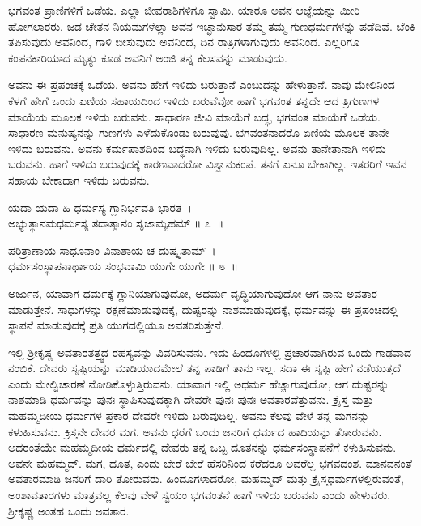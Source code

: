 ಭಗವಂತ ಪ್ರಾಣಿಗಳಿಗೆ ಒಡೆಯ. ಎಲ್ಲಾ ಜೀವರಾಶಿಗಳಿಗೂ ಸ್ವಾಮಿ. ಯಾರೂ ಅವನ ಆಜ್ಞೆಯನ್ನು ಮೀರಿ ಹೋಗಲಾರರು. ಜಡ ಚೇತನ ನಿಯಮಗಳೆಲ್ಲಾ ಅವನ ಇಚ್ಛಾನುಸಾರ ತಮ್ಮ ತಮ್ಮ ಗುಣಧರ್ಮಗಳನ್ನು ಪಡೆದಿವೆ. ಬೆಂಕಿ ತಪಿಸುವುದು ಅವನಿಂದ, ಗಾಳಿ ಬೀಸುವುದು ಅವನಿಂದ, ದಿನ ರಾತ್ರಿಗಳಾಗುವುದು ಅವನಿಂದ. ಎಲ್ಲರಿಗೂ ಕಂಪನಕಾರಿಯಾದ ಮೃತ್ಯು ಕೂಡ ಅವನಿಗೆ ಅಂಜಿ ತನ್ನ ಕೆಲಸವನ್ನು ಮಾಡುವುದು.

ಅವನು ಈ ಪ್ರಪಂಚಕ್ಕೆ ಒಡೆಯ. ಅವನು ಹೇಗೆ ಇಳಿದು ಬರುತ್ತಾನೆ ಎಂಬುದನ್ನು ಹೇಳುತ್ತಾನೆ. ನಾವು ಮೇಲಿನಿಂದ ಕೆಳಗೆ ಹೇಗೆ ಒಂದು ಏಣಿಯ ಸಹಾಯದಿಂದ ಇಳಿದು ಬರುವೆವೋ ಹಾಗೆ ಭಗವಂತ ತನ್ನದೇ ಆದ ತ್ರಿಗುಣಗಳ ಮಾಯೆಯ ಮೂಲಕ ಇಳಿದು ಬರುವನು. ಸಾಧಾರಣ ಜೀವಿ ಮಾಯೆಗೆ ಬದ್ಧ, ಭಗವಂತ ಮಾಯೆಗೆ ಒಡೆಯ. ಸಾಧಾರಣ ಮನುಷ್ಯನನ್ನು ಗುಣಗಳು ಎಳೆದುಕೊಂಡು ಬರುವುವು. ಭಗವಂತನಾದರೊ ಏಣಿಯ ಮೂಲಕ ತಾನೇ ಇಳಿದು ಬರುವನು. ಅವನು ಕರ್ಮಪಾಶದಿಂದ ಬದ್ಧನಾಗಿ ಇಳಿದು ಬರುವುದಿಲ್ಲ. ಅವನು ತಾನೇತಾನಾಗಿ ಇಳಿದು ಬರುವನು. ಹಾಗೆ ಇಳಿದು ಬರುವುದಕ್ಕೆ ಕಾರಣವಾದರೋ ವಿಶ್ವಾನುಕಂಪೆ. ತನಗೆ ಏನೂ ಬೇಕಾಗಿಲ್ಲ. ಇತರರಿಗೆ ಇವನ ಸಹಾಯ ಬೇಕಾದಾಗ ಇಳಿದು ಬರುವನು.

\begin{shloka}
ಯದಾ ಯದಾ ಹಿ ಧರ್ಮಸ್ಯ ಗ್ಲಾನಿರ್ಭವತಿ ಭಾರತ~।\\ಅಭ್ಯುತ್ಥಾನಮಧರ್ಮಸ್ಯ ತದಾತ್ಮಾನಂ ಸೃಜಾಮ್ಯಹಮ್ \hfill॥ ೭~॥
\end{shloka}

\begin{shloka}
ಪರಿತ್ರಾಣಾಯ ಸಾಧೂನಾಂ ವಿನಾಶಾಯ ಚ ದುಷ್ಕೃತಾಮ್~।\\ಧರ್ಮಸಂಸ್ಥಾಪನಾರ್ಥಾಯ ಸಂಭವಾಮಿ ಯುಗೇ ಯುಗೇ \hfill॥ ೮~॥
\end{shloka}

\begin{artha}
ಅರ್ಜುನ, ಯಾವಾಗ ಧರ್ಮಕ್ಕೆ ಗ್ಲಾನಿಯಾಗುವುದೋ, ಅಧರ್ಮ ವೃದ್ಧಿಯಾಗುವುದೋ ಆಗ ನಾನು ಅವತಾರ ಮಾಡುತ್ತೇನೆ. ಸಾಧುಗಳನ್ನು ರಕ್ಷಣೆಮಾಡುವುದಕ್ಕೆ, ದುಷ್ಟರನ್ನು ನಾಶಮಾಡುವುದಕ್ಕೆ, ಧರ್ಮವನ್ನು ಈ ಪ್ರಪಂಚದಲ್ಲಿ ಸ್ಥಾಪನೆ ಮಾಡುವುದಕ್ಕೆ ಪ್ರತಿ ಯುಗದಲ್ಲಿಯೂ ಅವತರಿಸುತ್ತೇನೆ.
\end{artha}

ಇಲ್ಲಿ ಶ‍್ರೀಕೃಷ್ಣ ಅವತಾರತತ್ತ್ವದ ರಹಸ್ಯವನ್ನು ವಿವರಿಸುವನು. ಇದು ಹಿಂದೂಗಳಲ್ಲಿ ಪ್ರಚಾರವಾಗಿರುವ ಒಂದು ಗಾಢವಾದ ನಂಬಿಕೆ. ದೇವರು ಸೃಷ್ಟಿಯನ್ನು ಮಾಡಿಯಾದಮೇಲೆ ತನ್ನ ಪಾಡಿಗೆ ತಾನು ಇಲ್ಲ. ಸದಾ ಈ ಸೃಷ್ಟಿ ಹೇಗೆ ನಡೆಯುತ್ತದೆ ಎಂದು ಮೇಲ್ವಿಚಾರಣೆ ನೋಡಿಕೊಳ್ಳುತ್ತಿರುವನು. ಯಾವಾಗ ಇಲ್ಲಿ ಅಧರ್ಮ ಹೆಚ್ಚಾಗುವುದೋ, ಆಗ ದುಷ್ಟರನ್ನು ನಾಶಮಾಡಿ ಧರ್ಮವನ್ನು ಪುನಃ ಸ್ಥಾಪಿಸುವುದಕ್ಕಾಗಿ ದೇವರೇ ಪುನಃ ಪುನಃ ಅವತಾರವೆತ್ತುವನು. ಕ್ರೈಸ್ತ ಮತ್ತು ಮಹಮ್ಮದೀಯ ಧರ್ಮಗಳ ಪ್ರಕಾರ ದೇವರೇ ಇಳಿದು ಬರುವುದಿಲ್ಲ. ಅವನು ಕೆಲವು ವೇಳೆ ತನ್ನ ಮಗನನ್ನು ಕಳುಹಿಸುವನು. ಕ್ರಿಸ್ತನೇ ದೇವರ ಮಗ. ಅವನು ಧರೆಗೆ ಬಂದು ಜನರಿಗೆ ಧರ್ಮದ ಹಾದಿಯನ್ನು ತೋರುವನು. ಅದರಂತೆಯೇ ಮಹಮ್ಮದೀಯ ಧರ್ಮದಲ್ಲಿ ದೇವರು ತನ್ನ ಒಬ್ಬ ದೂತನನ್ನು ಧರ್ಮಸಂಸ್ಥಾಪನೆಗೆ ಕಳುಹಿಸುವನು. ಅವನೇ ಮಹಮ್ಮದ್. ಮಗ, ದೂತ, ಎಂದು ಬೇರೆ ಬೇರೆ ಹೆಸರಿನಿಂದ ಕರೆದರೂ ಅವರೆಲ್ಲ ಭಗವದಂಶ. ಮಾನವನಂತೆ ಅವತಾರಮಾಡಿ ಜನರಿಗೆ ದಾರಿ ತೋರುವರು. ಹಿಂದೂಗಳಾದರೋ, ಮಹಮ್ಮದ್ ಮತ್ತು ಕ್ರೈಸ್ತಧರ್ಮಗಳಲ್ಲಿರುವಂತೆ, ಅಂಶಾವತಾರಗಳು ಮಾತ್ರವಲ್ಲ ಕೆಲವು ವೇಳೆ ಸ್ವಯಂ ಭಗವಂತನೆ ಹಾಗೆ ಇಳಿದು ಬರುವನು ಎಂದು ಹೇಳುವರು. ಶ‍್ರೀಕೃಷ್ಣ ಅಂತಹ ಒಂದು ಅವತಾರ.


